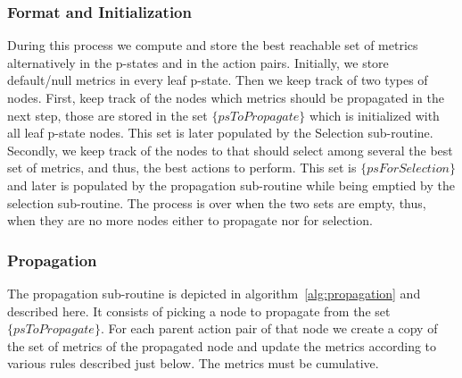     \subsubsection{Format and Initialization}

During this process we compute and store the best reachable set of metrics alternatively in the p-states and in the action pairs. Initially, we store default/null metrics in every leaf p-state. Then we keep track of two types of nodes. First, keep track of the nodes which metrics should be propagated in the next step, those are stored in the set $\{psToPropagate\}$ which is initialized with all leaf p-state nodes. This set is later populated by the Selection sub-routine. Secondly, we keep track of the nodes to that should select among several the best set of metrics, and thus, the best actions to perform. This set is $\{psForSelection\}$ and later is populated by the propagation sub-routine while being emptied by the selection sub-routine. The process is over when the two sets are empty, thus, when they are no more nodes either to propagate nor for selection.


    \subsubsection{Propagation}

The propagation sub-routine is depicted in algorithm~\ref{alg:propagation} and described here. It consists of picking a node to propagate from the set $\{psToPropagate\}$. For each parent action pair of that node we create a copy of the set of metrics of the propagated node and update the metrics according to various rules described just below.
The metrics must be cumulative. 

